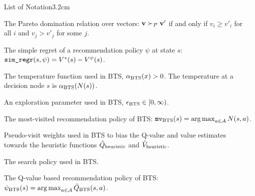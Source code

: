 \begin{mclistof}{List of Notation}{3.2cm}
    \item[$\succ_P$]
        The \textnormal{Pareto domination} relation over vectors: $\mathbf{v}\succ_P\mathbf{v'}$ if and only if $v_i\geq v'_i$ for all $i$ and $v_j>v'_j$ for some $j$. %
    \\
    \item[$\sreg(s,\psi)$]
        The \textnormal{simple regret} of a recommendation policy $\psi$ at state $s$: ${\textnormal{\texttt{sim\_regr}}}(s,\psi) = V^*(s) - V^{\psi}(s)$. %
    \\
    \item[$\alphabts$] 
        The temperature function used in BTS, ${\alpha_{{\textnormal{BTS}}}}(x)>0$. The temperature at a decision node $s$ is ${\alpha_{{\textnormal{BTS}}}}(N(s))$.
    \item[$\epsbts$]
        An exploration parameter used in BTS, ${\epsilon_{{\textnormal{BTS}}}}\in[0,\infty)$.
    \item[$\mvbts$]
        The most-visited recommendation policy of BTS: ${\textup{\texttt{mv}}_{{\textnormal{BTS}}}}(s)=\operatorname*{arg\,max}_{a\in\mathcal{A}} N(s,a)$.
    \item[$\Nqbts, \Nvbts$]
        \hspace{0.25cm} Pseudo-visit weights used in BTS to bias the Q-value and value estimates towards the heuristic functions ${\hat{Q}_{\textnormal{heuristic}}}$ and ${\hat{V}_{\textnormal{heuristic}}}$.
    \item[$\pibts$]
        The search policy used in BTS.
    \item[$\psibts$]
        The Q-value based recommendation policy of BTS: ${\psi_{{\textnormal{BTS}}}}(s)=\operatorname*{arg\,max}_{a\in\mathcal{A}}{\hat{Q}_{{\textnormal{BTS}}}}(s,a)$.
    \item[$\Qbts(s,a)$]

\end{mclistof}
